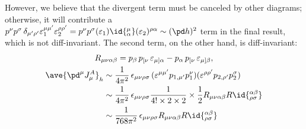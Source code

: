 \documentclass[a4paper,10pt]{article}
\begin{document}
\begin{enumerate}
\begin{enumerate}
	However, we believe that the divergent term must be canceled by other diagrams; otherwise, it will contribute a $
		p^\nu p^\sigma\,
		\delta_{\mu'\rho'}
			\varepsilon^{\mu\mu'}_1
			\varepsilon^{\rho\rho'}_2
		= p^\nu p^\sigma
		(\varepsilon_1)\id{^\mu_\alpha}
			(\varepsilon_2)^{\rho\alpha}
		\sim (\pd h)^2
	$ term in the final result, which is not diff-invariant. The second term, on the other hand, is diff-invariant:
	\begin{gather}
		R_{\mu\nu\alpha\beta}
		= p_\beta\,p_{[\nu}\,
				\varepsilon_{\mu]\alpha}
			- p_\alpha\,p_{[\nu}\,
				\varepsilon_{\mu]\beta},\\
	\begin{aligned}
		\ave{\pd^\mu J_\mu^A}_h
		&\sim \frac{1}{4\pi^2}\,
			\epsilon_{\mu\nu\rho\sigma}\,
			(\varepsilon^{\mu\mu'}
				p_{1,\mu'} p_1^\nu)
			(\varepsilon^{\rho\rho'}
				 p_{2,\rho'} p_2^\sigma) \\
		&\sim \frac{1}{4\pi^2}\,
			\epsilon_{\mu\nu\rho\sigma}
			\frac{1}{4!\times 2\times 2}\times
			\frac{1}{2}
				R_{\mu\nu\alpha\beta}
				R\id{_{\rho\sigma}^{\alpha\beta}} \\
		&\sim \frac{1}{768\pi^2}\,
			\epsilon_{\mu\nu\rho\sigma}
				R_{\mu\nu\alpha\beta}
				R\id{_{\rho\sigma}^{\alpha\beta}}
	\end{aligned}
	\end{gather}
	

\end{enumerate}
\end{enumerate}
\end{document}
